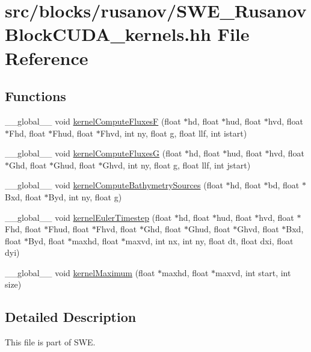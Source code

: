 \hypertarget{SWE__RusanovBlockCUDA__kernels_8hh}{\section{src/blocks/rusanov/\-S\-W\-E\-\_\-\-Rusanov\-Block\-C\-U\-D\-A\-\_\-kernels.hh File Reference}
\label{SWE__RusanovBlockCUDA__kernels_8hh}
}
\subsection*{Functions}
\begin{DoxyCompactItemize}
\item 
\-\_\-\-\_\-global\-\_\-\-\_\- void \hyperlink{SWE__RusanovBlockCUDA__kernels_8hh_a125f373796424316bc49a0eb60f5f90e}{kernel\-Compute\-Fluxes\-F} (float $\ast$hd, float $\ast$hud, float $\ast$hvd, float $\ast$Fhd, float $\ast$Fhud, float $\ast$Fhvd, int ny, float g, float llf, int istart)
\item 
\-\_\-\-\_\-global\-\_\-\-\_\- void \hyperlink{SWE__RusanovBlockCUDA__kernels_8hh_a4a5d67e82c837347e337904d4c17cc07}{kernel\-Compute\-Fluxes\-G} (float $\ast$hd, float $\ast$hud, float $\ast$hvd, float $\ast$Ghd, float $\ast$Ghud, float $\ast$Ghvd, int ny, float g, float llf, int jstart)
\item 
\-\_\-\-\_\-global\-\_\-\-\_\- void \hyperlink{SWE__RusanovBlockCUDA__kernels_8hh_aa7530530448af30119436099351cfead}{kernel\-Compute\-Bathymetry\-Sources} (float $\ast$hd, float $\ast$bd, float $\ast$Bxd, float $\ast$Byd, int ny, float g)
\item 
\-\_\-\-\_\-global\-\_\-\-\_\- void \hyperlink{SWE__RusanovBlockCUDA__kernels_8hh_a105ff13519fe40ec2acbc182d5584a07}{kernel\-Euler\-Timestep} (float $\ast$hd, float $\ast$hud, float $\ast$hvd, float $\ast$Fhd, float $\ast$Fhud, float $\ast$Fhvd, float $\ast$Ghd, float $\ast$Ghud, float $\ast$Ghvd, float $\ast$Bxd, float $\ast$Byd, float $\ast$maxhd, float $\ast$maxvd, int nx, int ny, float dt, float dxi, float dyi)
\item 
\-\_\-\-\_\-global\-\_\-\-\_\- void \hyperlink{SWE__RusanovBlockCUDA__kernels_8hh_ae810017f0a27a38e1c5d78c7130e8ab4}{kernel\-Maximum} (float $\ast$maxhd, float $\ast$maxvd, int start, int size)
\end{DoxyCompactItemize}


\subsection{Detailed Description}
This file is part of S\-W\-E.

